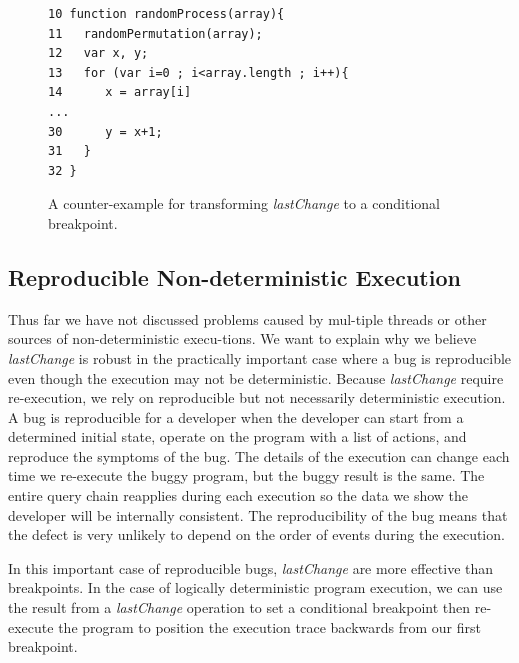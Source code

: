 \documentclass[preprint]{sigplanconf}
\begin{document}
\begin{figure}[htp]
\begin{verbatim}
10 function randomProcess(array){
11   randomPermutation(array);
12   var x, y;
13   for (var i=0 ; i<array.length ; i++){
14      x = array[i]
...
30      y = x+1;
31   }
32 }
\end{verbatim}
\caption{A counter-example for transforming \textit{lastChange} to a conditional breakpoint.}
\label{fig:counter-example}
\end{figure}
 

\subsection{Reproducible Non-deterministic Execution}
Thus far we have not discussed problems caused by mul-tiple threads or other sources of non-deterministic execu-tions. We want to explain why we believe \textit{lastChange} is robust in the practically important case where a bug is reproducible even though the execution may not be deterministic. 
Because \textit{lastChange} require re-execution, we rely on reproducible but not necessarily deterministic execution. A bug is reproducible for a developer when the developer can start from a determined initial state, operate on the program with a list of actions, and reproduce the symptoms of the bug. The details of the execution can change each time we re-execute the buggy program, but the buggy result is the same. The entire query chain reapplies during each execution so the data we show the developer will be internally consistent. The reproducibility of the bug means that the defect is very unlikely to depend on the order of events during the execution.

In this important case of reproducible bugs, \textit{lastChange} are more effective than breakpoints. In the case of logically deterministic program execution, we can use the result from a \textit{lastChange} operation to set a conditional breakpoint then re-execute the program to position the execution trace backwards from our first breakpoint. %
\end{document}
